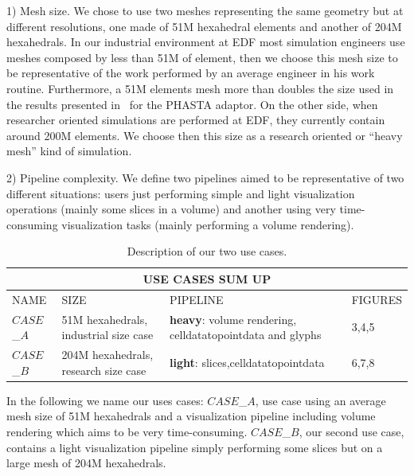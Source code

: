 1) Mesh size. We chose to use two meshes representing the same geometry but at
different resolutions, one made of 51M hexahedral elements and another of 204M
hexahedrals. In our industrial environment at EDF most simulation engineers use
meshes composed by less than 51M of element, then we choose this mesh size to be
representative of the work performed by an average engineer in his work routine.
Furthermore, a 51M elements mesh more than doubles the size used in the results
presented in~\cite{6092322} for the PHASTA adaptor. On the other side, when researcher
oriented simulations are performed at EDF, they currently contain around 200M
elements. We choose then this size as a research oriented or ``heavy mesh'' kind
of simulation.

2) Pipeline complexity. We define two pipelines aimed to be representative of two
different situations: users just performing simple and light visualization
operations (mainly some slices in a volume) and another using very
time-consuming visualization tasks (mainly performing a volume rendering).

\begin{table}
\centering
\begin{tabular}{|p{1.5cm}|p{3.0cm}|p{2.70cm}|p{1.50cm}|}
\hline
\multicolumn{4}{|c|}{\textbf{USE CASES SUM UP}}\\
\hline
NAME & SIZE & PIPELINE & FIGURES \\
\hline
$CASE$\_$A$ & 51M hexahedrals, \newline industrial size case & \textbf{heavy}: \newline volume rendering, \newline celldatatopointdata \newline and glyphs  & 3,4,5   \\
\hline
$CASE$\_$B$ & 204M hexahedrals, \newline research size case & \textbf{light}: \newline 9 slices,\newline celldatatopointdata  & 6,7,8   \\
\hline
\end{tabular}
\caption{Description of our two use cases.}
\label{fig:tab}
\vspace{-0.15in}
\end{table}
In the following we name our uses cases:
$CASE$\_$A$, use case using an average mesh size of 51M hexahedrals and a
visualization pipeline including volume rendering which aims to be very time-consuming.
$CASE$\_$B$, our second use case, contains a light visualization pipeline simply
performing some slices but on a large mesh of 204M hexahedrals.

